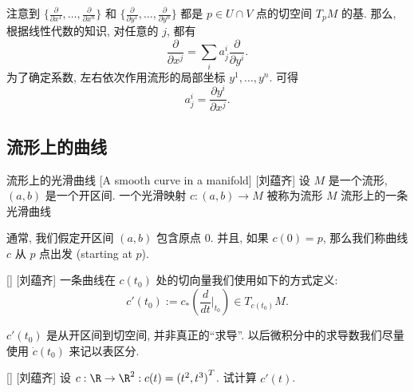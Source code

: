 \documentclass[UTF8]{ctexart}
\begin{document}
        \begin{prf}
            注意到 \(\{\frac{\partial}{\partial x^1}, \dots, \frac{\partial}{\partial x^n}\}\) 和 \(\{\frac{\partial}{\partial y^1}, \dots, \frac{\partial}{\partial y^n}\}\) 都是 \(p \in U \cap V\) 点的切空间 \(T_p M\) 的基. 那么, 根据线性代数的知识, 对任意的 \(j\), 都有
            \[
                \frac{\partial}{\partial x^j} = \sum_{i} a^i_j
                \frac{\partial}{\partial y^i}.
            \]
            为了确定系数, 左右依次作用流形的局部坐标 \(y^1, \dots, y^n\). 可得
            \[
                a^i_j = 
                \frac{\partial y^i}{\partial x^j}.
            \]
        \end{prf}
    
    \subsection{流形上的曲线}

        \begin{dfn}
            []
            {流形上的光滑曲线}
            [A smooth curve in a manifold]
            [刘蕴齐]
            设 \(M\) 是一个流形,  \((a,b)\) 是一个开区间. 一个光滑映射 \(c: (a, b) \rightarrow M\) 被称为流形 \(M\) 流形上的一条光滑曲线
        \end{dfn}

        \begin{rmk}
            []
            通常, 我们假定开区间 \((a,b)\) 包含原点 \(0\). 并且, 如果 \(c(0) = p\), 那么我们称曲线 \(c\) 从 \(p\) 点出发 (starting at  \(p\)).
        \end{rmk}
        
        \begin{dfn}
            []
            {}
            []
            [刘蕴齐]
            一条曲线在 \(c(t_0)\) 处的切向量我们使用如下的方式定义:
            \[
                c'(t_0):= c_{*}(\frac{d}{dt}|_{t_0}) \in T_{c(t_0)}M.
            \]
        \end{dfn}

        \begin{rmk}
            []
             \(c'(t_0)\) 是从开区间到切空间, 并非真正的“求导”. 以后微积分中的求导数我们尽量使用 \(\dot{c}(t_0)\) 来记以表区分. 
        \end{rmk}

        \begin{xmp}
            []
            {}
            []
            [刘蕴齐]
            设 \(c: \R \rightarrow \R^2: c(t) = {(t^2, t^3)}^T\). 试计算 \(c'(t)\). 
        \end{xmp}
\end{document}
